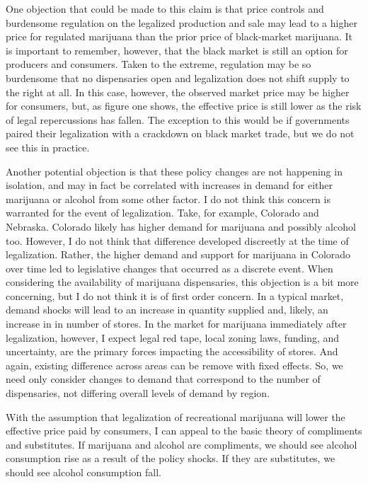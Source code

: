 \documentclass[11pt]{article}
\begin{document}
One objection that could be made to this claim is that price controls and burdensome regulation on the legalized production and sale may lead to a higher price for regulated marijuana than the prior price of black-market marijuana. It is important to remember, however, that the black market is still an option for producers and consumers. Taken to the extreme, regulation may be so burdensome that no dispensaries open and legalization does not shift supply to the right at all. In this case, however, the observed market price may be higher for consumers, but, as figure one shows, the effective price is still lower as the risk of legal repercussions has fallen. The exception to this would be if governments paired their legalization with a crackdown on black market trade, but we do not see this in practice. \par

Another potential objection is that these policy changes are not happening in isolation, and may in fact be correlated with increases in demand for either marijuana or alcohol from some other factor. I do not think this concern is warranted for the event of legalization. Take, for example, Colorado and Nebraska. Colorado likely has higher demand for marijuana and possibly alcohol too. However, I do not think that difference developed discreetly at the time of legalization. Rather, the higher demand and support for marijuana in Colorado over time led to legislative changes that occurred as a discrete event. When considering the availability of marijuana dispensaries, this objection is a bit more concerning, but I do not think it is of first order concern. In a typical market, demand shocks will lead to an increase in quantity supplied and, likely, an increase in in number of stores. In the market for marijuana immediately after legalization, however, I expect legal red tape, local zoning laws, funding, and uncertainty, are the primary forces impacting the accessibility of stores. And again, existing difference across areas can be remove with fixed effects. So, we need only consider changes to demand that correspond to the number of dispensaries, not differing overall levels of demand by region. 


With the assumption that legalization of recreational marijuana will lower the effective price paid by consumers, I can appeal to the basic theory of compliments and substitutes. If marijuana and alcohol are compliments, we should see alcohol consumption rise as a result of the policy shocks. If they are substitutes, we should see alcohol consumption fall.\par
\end{document}

